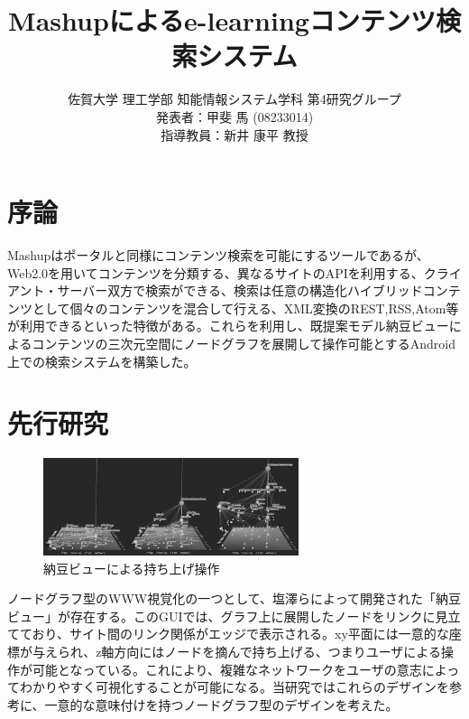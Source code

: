 \documentclass[twocolumn,a4j]{jarticle}
\title{Mashupによるe-learningコンテンツ検索システム}
\author{佐賀大学 理工学部 知能情報システム学科 第4研究グループ\\ 発表者：甲斐 \UTF{F9C3}馬 (08233014)\\ 指導教員：新井 康平 教授}
\begin{document}
\date{\empty}
\maketitle
\thispagestyle{empty}

\section{序論}
Mashupはポータルと同様にコンテンツ検索を可能にするツールであるが、Web2.0を用いてコンテンツを分類する、異なるサイトのAPIを利用する、クライアント・サーバー双方で検索ができる、検索は任意の構造化ハイブリッドコンテンツとして個々のコンテンツを混合して行える、XML変換のREST,RSS,Atom等が利用できるといった特徴がある。これらを利用し、既提案モデル納豆ビューによるコンテンツの三次元空間にノードグラフを展開して操作可能とするAndroid上での検索システムを構築した。

\section{先行研究}
\begin{figure}[htbp]
\begin{center}
\includegraphics[width=7.5cm]{eps/natto-kuro.eps}
\caption{納豆ビューによる持ち上げ操作}
\label{natto}
\end{center}
\end{figure}
ノードグラフ型のWWW視覚化の一つとして、塩澤らによって開発された「納豆ビュー」\cite{natto}が存在する。このGUIでは、グラフ上に展開したノードをリンクに見立てており、サイト間のリンク関係がエッジで表示される。xy平面には一意的な座標が与えられ、z軸方向にはノードを摘んで持ち上げる、つまりユーザによる操作が可能となっている。これにより、複雑なネットワークをユーザの意志によってわかりやすく可視化することが可能になる。当研究ではこれらのデザインを参考に、一意的な意味付けを持つノードグラフ型のデザインを考えた。
\end{document}

